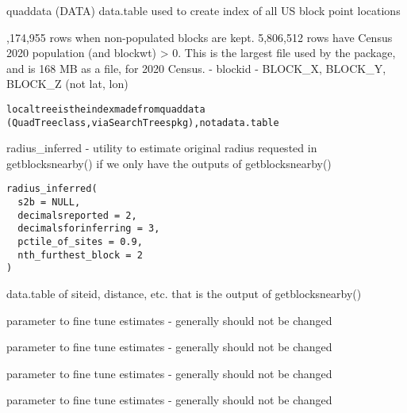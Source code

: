 \documentclass[a4paper]{book}
\begin{document}
%
\begin{Description}\relax
quaddata (DATA) data.table used to create index of all US block point locations
\end{Description}
%
\begin{Details},174,955 rows when non-populated blocks are kept.
5,806,512 rows have Census 2020 population (and blockwt) > 0.
This is the largest file used by the package, and is 168 MB as a file, for 2020 Census.
- blockid
- BLOCK\_X, BLOCK\_Y, BLOCK\_Z  (not lat, lon)

\begin{alltt}localtree is the index made from quaddata  
(QuadTree class, via SearchTrees pkg), not a data.table
\end{alltt}

\end{Details}
%
\begin{SeeAlso}\relax
{} 
\end{SeeAlso}
%
\begin{Description}\relax
radius\_inferred - utility to estimate original radius requested in getblocksnearby()
if we only have the outputs of getblocksnearby()
\end{Description}
%
\begin{Usage}
\begin{verbatim}
radius_inferred(
  s2b = NULL,
  decimalsreported = 2,
  decimalsforinferring = 3,
  pctile_of_sites = 0.9,
  nth_furthest_block = 2
)
\end{verbatim}
\end{Usage}
%
\begin{Arguments}
\begin{ldescription}
\item[\code{s2b}] data.table of siteid, distance, etc. that is the output of getblocksnearby()

\item[\code{decimalsreported}] parameter to fine tune estimates - generally should not be changed

\item[\code{decimalsforinferring}] parameter to fine tune estimates - generally should not be changed

\item[\code{pctile\_of\_sites}] parameter to fine tune estimates - generally should not be changed

\item[\code{nth\_furthest\_block}] parameter to fine tune estimates - generally should not be changed
\end{ldescription}
\end{Arguments}
\end{document}
